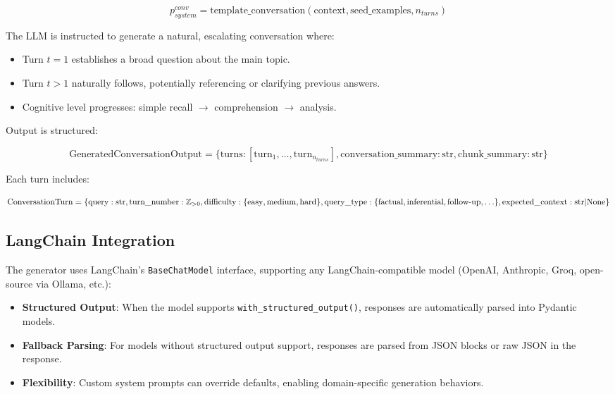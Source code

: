 \documentclass[11pt,a4paper]{article}
\begin{document}
\begin{equation}
p_{system}^{conv} = \text{template\_conversation}(\text{context}, \text{seed\_examples}, n_{turns})
\end{equation}

The LLM is instructed to generate a natural, escalating conversation where:
\begin{itemize}
    \item Turn $t=1$ establishes a broad question about the main topic.
    \item Turn $t > 1$ naturally follows, potentially referencing or clarifying previous answers.
    \item Cognitive level progresses: simple recall $\rightarrow$ comprehension $\rightarrow$ analysis.
\end{itemize}

Output is structured:

\begin{equation}
\text{GeneratedConversationOutput} = \{
    \text{turns}: [\text{turn}_1, \ldots, \text{turn}_{n_{turns}}],
    \text{conversation\_summary}: \text{str},
    \text{chunk\_summary}: \text{str}
\}
\end{equation}

Each turn includes:

\begin{equation}
\text{ConversationTurn} = \{
    \text{query}: \text{str},
    \text{turn\_number}: \mathbb{Z}_{>0},
    \text{difficulty}: \{\text{easy}, \text{medium}, \text{hard}\},
    \text{query\_type}: \{\text{factual}, \text{inferential}, \text{follow\text{-}up}, \ldots\},
    \text{expected\_context}: \text{str} | \text{None}
\}
\end{equation}

\subsection{LangChain Integration}

The generator uses LangChain's \texttt{BaseChatModel} interface, supporting any LangChain-compatible model (OpenAI, Anthropic, Groq, open-source via Ollama, etc.):

\begin{itemize}
    \item \textbf{Structured Output}: When the model supports \texttt{with\_structured\_output()}, responses are automatically parsed into Pydantic models.

    \item \textbf{Fallback Parsing}: For models without structured output support, responses are parsed from JSON blocks or raw JSON in the response.

    \item \textbf{Flexibility}: Custom system prompts can override defaults, enabling domain-specific generation behaviors.
\end{itemize}
\end{document}
